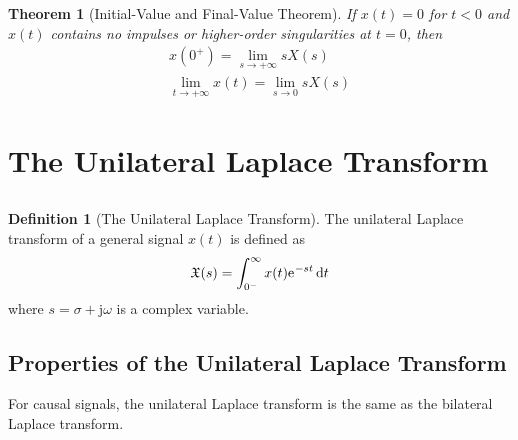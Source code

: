 \documentclass[10pt,UTF8]{article}
\newenvironment{definition box}
{\begin{tcolorbox}[colback=blue!5!white,colframe=blue!75!black,parbox=false,before upper=\par,before lower=\par]}
{\end{tcolorbox}}
\newenvironment{theorem box}
{\begin{tcolorbox}[colback=yellow!5!white,colframe=yellow!75!black,parbox=false,before upper=\par,before lower=\par]}
{\end{tcolorbox}}
\theoremstyle{definition}
\newtheorem{definition inner}{Definition}[section]
\newenvironment{definition}[1][]
{\begin{definition box}\begin{definition inner}[#1]\hfill\par}
{\end{definition inner}\end{definition box}}
\theoremstyle{plain}
\newtheorem{theorem inner}{Theorem}[section]
\newenvironment{theorem}[1][]
{\begin{theorem box}\begin{theorem inner}[#1]\hfill\par}
{\end{theorem inner}\end{theorem box}}
\theoremstyle{definition}
\newtheorem*{proof inner}{\textit{Proof}}
\theoremstyle{remark}
\newcommand{\ju}{\mathrm{j}}  %
\newcommand{\e}{\mathrm{e}{\mkern 1 mu}}
\begin{document}
\begin{theorem}[Initial-Value and Final-Value Theorem]
    If $x(t)=0$ for $t<0$ and $x(t)$ contains no impulses or higher-order singularities at $t=0$, then
    \begin{gather*}
        x(0^+) = \lim_{s\to+\infty} s X(s) \\
        \lim_{t\to+\infty} x(t) = \lim_{s\to 0} s X(s)
    \end{gather*}
\end{theorem}



\section{The Unilateral Laplace Transform}

\subsection{}

\begin{definition}[The Unilateral Laplace Transform]
The unilateral Laplace transform of a general signal $x(t)$ is defined as
\begin{equation*}
    \mathfrak{X}(s) =
    \int_{0^-}^{\infty}x(t)\e^{-s t}\dd{t}
\end{equation*}
where $s=\sigma + \ju\omega$ is a complex variable.
\end{definition}


\subsection{Properties of the Unilateral Laplace Transform}

For causal signals, the unilateral Laplace transform is the same as the bilateral Laplace transform.

\subsubsection{}
\end{document}
